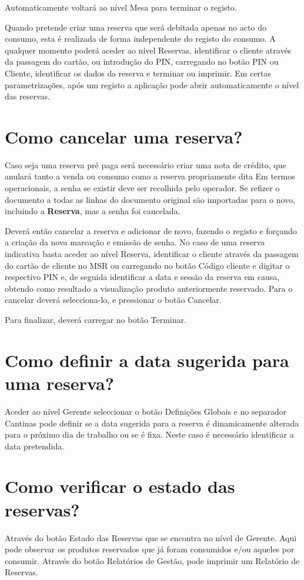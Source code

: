 \documentclass[a4paper,11pt,openany]{memoir}
\begin{document}
Automaticamente voltará ao nível Mesa para terminar o registo.

Quando pretende criar uma reserva que será debitada apenas no acto do consumo,
esta é realizada de forma independente do registo do consumo. A qualquer
momento poderá aceder ao nível Reservas, identificar o cliente através da
passagem do cartão, ou introdução do PIN, carregando no botão PIN ou Cliente,
identificar os dados da reserva e terminar ou imprimir.
Em certas parametrizações, após um registo a aplicação pode abrir
automaticamente o nível das reservas.

\section{Como cancelar uma reserva?}
Caso seja uma reserva pré paga será necessário criar uma nota de crédito, que
anulará tanto a venda ou consumo como a reserva propriamente dita Em termos
operacionais, a senha se existir deve ser recolhida pelo operador. Se refizer o
documento a todas as linhas do documento original são importadas para o novo,
incluindo a \textbf{Reserva}, mas a senha foi cancelada.

Deverá então cancelar a reserva
e adicionar de novo, fazendo o registo e forçando a criação da nova marcação e
emissão de senha. No caso de uma reserva indicativa basta aceder ao nível
Reserva, identificar o cliente através da passagem do cartão de cliente no MSR ou
carregando no botão Código cliente e digitar o respectivo PIN e, de seguida
identificar a data e sessão da reserva em causa, obtendo como resultado a
visualização produto anteriormente reservado. Para o cancelar deverá selecciona-lo,
e pressionar o botão Cancelar. 

Para finalizar, deverá carregar no botão Terminar.

\section{Como definir a data sugerida para uma reserva?}
Aceder ao nível Gerente seleccionar o botão Definições Globais e no separador
Cantinas pode definir se a data sugerida para a reserva é dinamicamente alterada
para o próximo dia de trabalho ou se é fixa. Neste caso é necessário identificar a
data pretendida.

\section{Como verificar o estado das reservas?}
Através do botão Estado das Reservas que se encontra no nível de Gerente. Aqui
pode observar os produtos reservados que já foram consumidos e/ou aqueles por
consumir. Através do botão Relatórios de Gestão, pode imprimir um Relatório de
Reservas.
\end{document}
